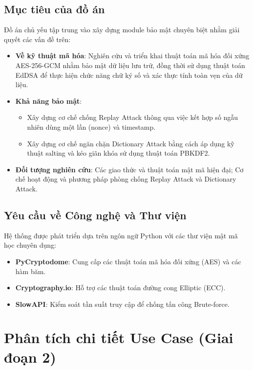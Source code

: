 \documentclass[11pt,a4paper]{article}
\begin{document}
\subsection{Mục tiêu của đồ án}
Đồ án chủ yếu tập trung vào xây dựng module bảo mật chuyên biệt nhằm giải quyết các vấn đề trên:
\begin{itemize}
    \item \textbf{Về kỹ thuật mã hóa}: Nghiên cứu và triển khai thuật toán mã hóa đối xứng AES-256-GCM nhằm bảo mật dữ liệu lưu trữ, đồng thời sử dụng thuật toán EdDSA để thực hiện chức năng chữ ký số và xác thực tính toàn vẹn của dữ liệu.
    \item \textbf{Khả năng bảo mật}: 
    \begin{itemize}
        \item Xây dựng cơ chế chống Replay Attack thông qua việc kết hợp số ngẫu nhiên dùng một lần (nonce) và timestamp.
        \item Xây dựng cơ chế ngăn chặn Dictionary Attack bằng cách áp dụng kỹ thuật salting và kéo giãn khóa sử dụng thuật toán PBKDF2.
    \end{itemize}
    \item \textbf{Đối tượng nghiên cứu}: Các giao thức và thuật toán mật mã hiện đại; Cơ chế hoạt động và phương pháp phòng chống Replay Attack và Dictionary Attack.
\end{itemize}

\subsection{Yêu cầu về Công nghệ và Thư viện}
Hệ thống được phát triển dựa trên ngôn ngữ Python với các thư viện mật mã học chuyên dụng:
\begin{itemize}
    \item \textbf{PyCryptodome}: Cung cấp các thuật toán mã hóa đối xứng (AES) và các hàm băm.
    \item \textbf{Cryptography.io}: Hỗ trợ các thuật toán đường cong Elliptic (ECC).
    \item \textbf{SlowAPI}: Kiểm soát tần suất truy cập để chống tấn công Brute-force.
\end{itemize}

\section{Phân tích chi tiết Use Case (Giai đoạn 2)}
\end{document}
